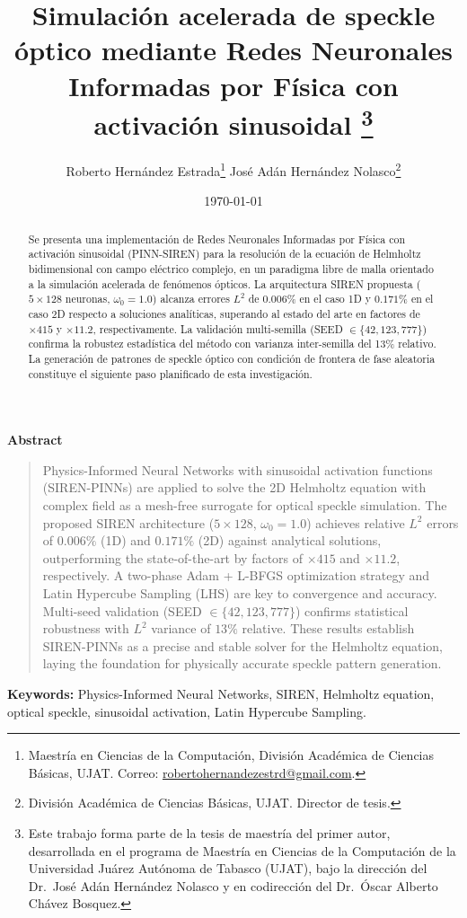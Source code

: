 \documentclass[12pt]{article}
\title{Simulación acelerada de speckle óptico mediante Redes
       Neuronales Informadas por Física con activación sinusoidal%
       \thanks{Este trabajo forma parte de la tesis de maestría del primer autor,
               desarrollada en el programa de Maestría en Ciencias de la Computación
               de la Universidad Juárez Autónoma de Tabasco (UJAT),
               bajo la dirección del Dr.\ José Adán Hernández Nolasco
               y en codirección del Dr.\ Óscar Alberto Chávez Bosquez.}}
\author{%
  Roberto Hernández Estrada\thanks{Maestría en Ciencias de la Computación,
    División Académica de Ciencias Básicas, UJAT.
    Correo: \href{mailto:robertohernandezestrd@gmail.com}{robertohernandezestrd@gmail.com}.} \quad
  José Adán Hernández Nolasco\thanks{División Académica de Ciencias Básicas, UJAT.
    Director de tesis.}
}
\date{\today}
\begin{document}

\maketitle
\thispagestyle{empty}

\begin{center}
  \textbf{Abstract}
\end{center}
\begin{quote}
\noindent\singlespacing
Physics-Informed Neural Networks with sinusoidal activation functions (SIREN-PINNs)
are applied to solve the 2D Helmholtz equation with complex field as a mesh-free
surrogate for optical speckle simulation.
The proposed SIREN architecture ($5 \times 128$, $\omega_0 = 1.0$) achieves relative
$L^2$ errors of $0.006\%$ (1D) and $0.171\%$ (2D) against analytical solutions,
outperforming the state-of-the-art by factors of $\times 415$ and $\times 11.2$,
respectively.
A two-phase Adam + L-BFGS optimization strategy and Latin Hypercube Sampling (LHS)
are key to convergence and accuracy.
Multi-seed validation (SEED $\in \{42, 123, 777\}$) confirms statistical robustness with
$L^2$ variance of $13\%$ relative.
These results establish SIREN-PINNs as a precise and stable solver for the Helmholtz
equation, laying the foundation for physically accurate speckle pattern generation.
\end{quote}

\vspace{0.8em}
\noindent \textbf{Keywords:} Physics-Informed Neural Networks, SIREN,
Helmholtz equation, optical speckle, sinusoidal activation, Latin Hypercube Sampling.

\vspace{1.2em}
\newpage
\begin{abstract}
\noindent\singlespacing
Se presenta una implementación de Redes Neuronales Informadas por Física con
activación sinusoidal (PINN-SIREN) para la resolución de la ecuación de Helmholtz
bidimensional con campo eléctrico complejo, en un paradigma libre de malla orientado
a la simulación acelerada de fenómenos ópticos.
La arquitectura SIREN propuesta ($5 \times 128$ neuronas, $\omega_0 = 1.0$)
alcanza errores $L^2$ de $0.006\%$ en el caso 1D y $0.171\%$ en el caso 2D
respecto a soluciones analíticas, superando al estado del arte en factores de
$\times 415$ y $\times 11.2$, respectivamente.
La validación multi-semilla (SEED $\in \{42, 123, 777\}$) confirma la robustez
estadística del método con varianza inter-semilla del 13\% relativo.
La generación de patrones de speckle óptico con condición de frontera de fase
aleatoria constituye el siguiente paso planificado de esta investigación.
\end{abstract}
\end{document}
